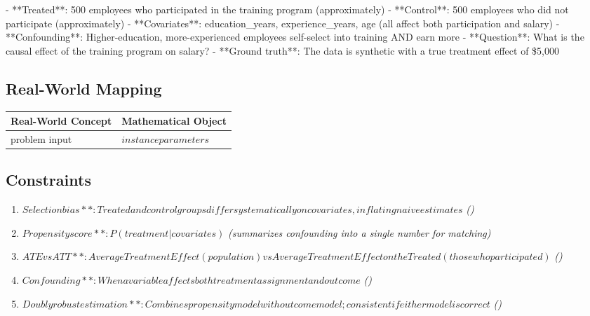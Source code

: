 \documentclass[11pt, a4paper]{article}
\begin{document}
- **Treated**: 500 employees who participated in the training program (approximately)
- **Control**: 500 employees who did not participate (approximately)
- **Covariates**: education\_years, experience\_years, age (all affect both participation and salary)
- **Confounding**: Higher-education, more-experienced employees self-select into training AND earn more
- **Question**: What is the causal effect of the training program on salary?
- **Ground truth**: The data is synthetic with a true treatment effect of \$5,000

\subsection{Real-World Mapping}

\begin{longtable}{ll}
\toprule
\textbf{Real-World Concept} & \textbf{Mathematical Object} \\
\midrule
\endhead
problem input & $instance parameters$ \\
\bottomrule
\end{longtable}

\subsection{Constraints}

\begin{enumerate}
  \item $Selection bias**: Treated and control groups differ systematically on covariates, inflating naive estimates$
  \hfill \textit{()}
  \item $Propensity score**: P(treatment | covariates)$
  \hfill \textit{(summarizes confounding into a single number for matching)}
  \item $ATE vs ATT**: Average Treatment Effect (population) vs Average Treatment Effect on the Treated (those who participated)$
  \hfill \textit{()}
  \item $Confounding**: When a variable affects both treatment assignment and outcome$
  \hfill \textit{()}
  \item $Doubly robust estimation**: Combines propensity model with outcome model; consistent if either model is correct$
  \hfill \textit{()}
\end{enumerate}

\end{document}
